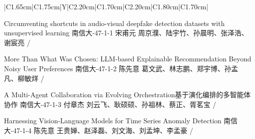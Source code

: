 \Needspace{7.5cm}
\begin{tabularx}{\textwidth}{|C{1.65cm}|C{1.75cm}|Y|C{2.20cm}|C{1.70cm}|C{2.20cm}|C{1.80cm}|C{1.70cm}|}
\HeaderRow

{Circumventing shortcuts in audio-visual deepfake detection datasets with unsupervised learning\newline }
{南信大-47-1-1}
{宋甫元}
{周京濮、陆宇竹、孙晨明、张泽浩、谢宸亮}
{}{/}

{More Than What Was Chosen: LLM-based Explainable Recommendation Beyond Noisy User Preferences\newline }
{南信大-47-1-2}
{陈先意}
{葛文武、林志鹏、郑宇博、孙孟凡、柳敏烊}
{}{/}


{A Multi-Agent Collaboration via Evolving Orchestration\newline 基于演化编排的多智能体协作}
{南信大-47-1-3}
{付章杰}
{刘云飞、耿硕硕、孙祖林、蔡正、胥茗宝}
{}{/}

{Harnessing Vision-Language Models for Time Series Anomaly Detection\newline}
{南信大-47-1-4}
{陈先意}
{王贵婵、赵泽磊、刘文海、刘孟坤、李孟豪}
{}{/}
\end{tabularx}
\BlockGap



